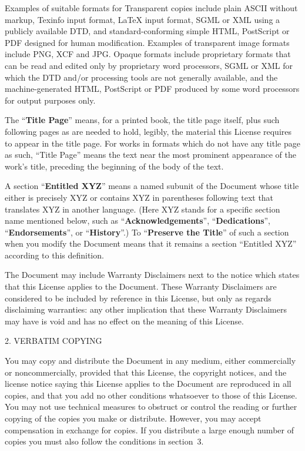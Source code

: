 \documentclass[10pt,a4paper,final]{book}
\begin{document}
{Examples of suitable formats for Transparent copies include plain
ASCII without markup, Texinfo input format, LaTeX input format, SGML
or XML using a publicly available DTD, and standard-conforming simple
HTML, PostScript or PDF designed for human modification.  Examples of
transparent image formats include PNG, XCF and JPG.  Opaque formats
include proprietary formats that can be read and edited only by
proprietary word processors, SGML or XML for which the DTD and/or
processing tools are not generally available, and the
machine-generated HTML, PostScript or PDF produced by some word
processors for output purposes only.

The ``\textbf{Title Page}'' means, for a printed book, the title page itself,
plus such following pages as are needed to hold, legibly, the material
this License requires to appear in the title page.  For works in
formats which do not have any title page as such, ``Title Page'' means
the text near the most prominent appearance of the work's title,
preceding the beginning of the body of the text.

A section ``\textbf{Entitled XYZ}'' means a named subunit of the Document whose
title either is precisely XYZ or contains XYZ in parentheses follow\-ing
text that translates XYZ in another language.  (Here XYZ stands for a
specific section name mentioned below, such as ``\textbf{Acknow\-ledge\-ments}'',
``\textbf{De\-di\-ca\-tions}'', ``\textbf{Endorsements}'', or ``\textbf{History}''.)  
To ``\textbf{Preserve the Title}''
of such a section when you modify the Document means that it remains a
section ``Entitled XYZ'' according to this definition.

The Document may include Warranty Disclaimers next to the notice which
states that this License applies to the Document.  These Warranty
Disclaimers are considered to be included by reference in this
License, but only as regards disclaiming warranties: any other
implication that these Warranty Disclaimers may have is void and has
no effect on the meaning of this License.


\begin{center}
{\Large 2. VERBATIM COPYING\par}
\end{center}

You may copy and distribute the Document in any medium, either
commercially or noncommercially, provided that this License, the
copyright notices, and the license notice saying this License applies
to the Document are reproduced in all copies, and that you add no other
conditions whatsoever to those of this License.  You may not use
technical measures to obstruct or control the reading or further
copying of the copies you make or distribute.  However, you may accept
compensation in exchange for copies.  If you distribute a large enough
number of copies you must also follow the conditions in section~3.

}
\end{document}
